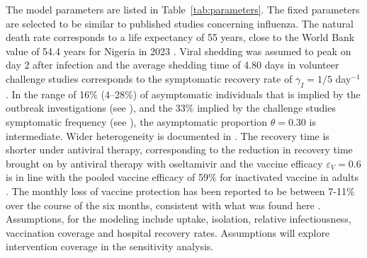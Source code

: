 \documentclass[12pt,a4paper]{article}
\theoremstyle{definition}
\theoremstyle{remark}
\begin{document}
The model parameters are listed in Table~\ref{tab:parameters}. The fixed parameters are selected to be similar to published studies concerning influenza. The natural death rate corresponds to a life expectancy of 55 years, close to the World Bank value of 54.4 years for Nigeria in 2023 \cite{worldbank2025lifeexp}. Viral shedding was assumed to peak on day 2 after infection \cite{carrat2008timelines} and the average shedding time of 4.80 days in volunteer challenge studies corresponds to the symptomatic recovery rate of $\gamma_I = 1/5$ day$^{-1}$. In the range of 16\% (4--28\%) of asymptomatic individuals that is implied by the outbreak investigations (see \cite{leung2015asymptomatic}), and the 33\% implied by the challenge studies symptomatic frequency (see \cite{carrat2008timelines}), the asymptomatic proportion $\theta = 0.30$ is intermediate. Wider heterogeneity is documented in \cite{furuya2016heterogeneous}. The recovery time is shorter under antiviral therapy, corresponding to the reduction in recovery time brought on by antiviral therapy with oseltamivir \cite{dobson2015oseltamivir} and the vaccine efficacy $\varepsilon_V = 0.6$ is in line with the pooled vaccine efficacy of 59\% for inactivated vaccine in adults \cite{osterholm2012efficacy}. The monthly loss of vaccine protection has been reported to be between 7-11\% over the course of the six months, consistent with what was found here \cite{ferdinands2017intraseason}. Assumptions, for the modeling include uptake, isolation, relative infectiousness, vaccination coverage and hospital recovery rates. Assumptions will explore intervention coverage in the sensitivity analysis.
\end{document}
